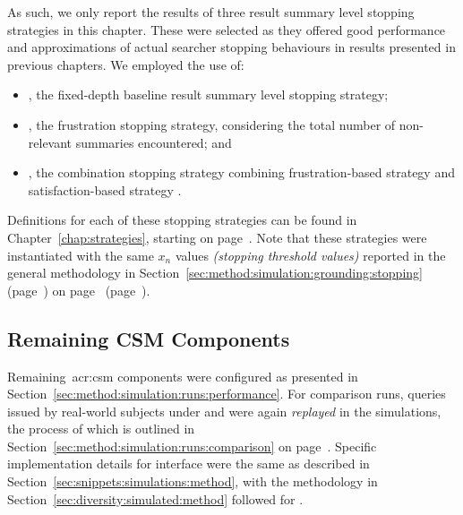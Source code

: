 As such, we only report the results of three result summary level stopping strategies in this chapter. These were selected as they offered good performance and approximations of actual searcher stopping behaviours in results presented in previous chapters. We employed the use of:

\begin{itemize}
    \item{, the fixed-depth baseline result summary level stopping strategy;}
    \item{, the frustration stopping strategy, considering the total number of non-relevant summaries encountered; and}
    \item{, the combination stopping strategy combining frustration-based strategy  and satisfaction-based strategy .}
\end{itemize}

Definitions for each of these stopping strategies can be found in Chapter~\ref{chap:strategies}, starting on page~\pageref{chap:strategies}. Note that these strategies were instantiated with the same $x_n$ values \emph{(stopping threshold values)} reported in the general methodology in Section~\ref{sec:method:simulation:grounding:stopping} (page~\pageref{sec:method:simulation:grounding:stopping}) on page~\pageref{sec:method:simulation:grounding:stopping} (page~\pageref{sec:method:simulation:grounding:stopping}).

\subsection{Remaining CSM Components}\label{sec:serp:method:other}
Remaining~\gls{acr:csm} components were configured as presented in Section~\ref{sec:method:simulation:runs:performance}. For comparison runs, queries issued by real-world subjects under  and  were again \emph{replayed} in the simulations, the process of which is outlined in Section~\ref{sec:method:simulation:runs:comparison} on page~\pageref{sec:method:simulation:runs:comparison}. Specific implementation details for interface  were the same as described in Section~\ref{sec:snippets:simulations:method}, with the methodology in Section~\ref{sec:diversity:simulated:method} followed for .

%

